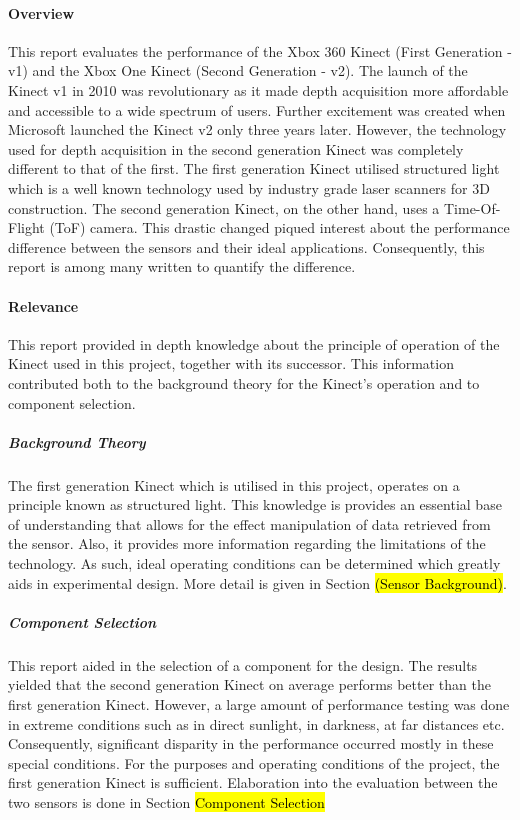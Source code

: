 \paragraph{Overview}
This report evaluates the performance of the Xbox 360 Kinect (First Generation - v1) and the Xbox One Kinect (Second Generation - v2). The launch of the Kinect v1 in 2010 was revolutionary as it made depth acquisition more affordable and accessible to a wide spectrum of users. Further excitement was created when Microsoft launched the Kinect v2 only three years later. However, the technology used for depth acquisition in the second generation Kinect was completely different to that of the first. The first generation Kinect utilised structured light which is a well known technology used by industry grade laser scanners for 3D construction. The second generation Kinect, on the other hand, uses a Time-Of-Flight (ToF) camera. This drastic changed piqued interest about the performance difference between the sensors and their ideal applications. Consequently, this report is among many written to quantify the difference. 

\paragraph{Relevance}
This report provided in depth knowledge about the principle of operation of the Kinect used in this project, together with its successor. This information contributed both to the background theory for the Kinect's operation and to component selection.

\subparagraph{Background Theory}
The first generation Kinect which is utilised in this project, operates on a principle known as structured light. This knowledge is provides an essential base of understanding that allows for the effect manipulation of data retrieved from the sensor. Also, it provides more information regarding the limitations of the technology. As such, ideal operating conditions can be determined which greatly aids in experimental design. More detail is given in Section \hl{(Sensor Background)}.

\subparagraph{Component Selection}
This report aided in the selection of a component for the design. The results yielded that the second generation Kinect on average performs better than the first generation Kinect. However, a large amount of performance testing was done in extreme conditions such as in direct sunlight, in darkness, at far distances etc. Consequently, significant disparity in the performance occurred mostly in these special conditions. For the purposes and operating conditions of the project, the first generation Kinect is sufficient. Elaboration into the evaluation between the two sensors is done in Section \hl{Component Selection} 




